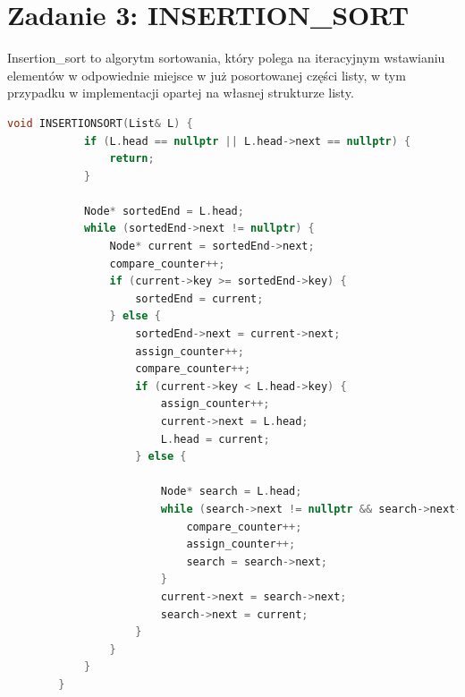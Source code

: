 \documentclass{article}
\theoremstyle{definition}
\begin{document}
	\section{Zadanie 3: INSERTION\_SORT}
	Insertion\_sort to algorytm sortowania, który polega na iteracyjnym wstawianiu elementów w odpowiednie miejsce w już posortowanej części listy, w tym przypadku w implementacji opartej na własnej strukturze listy.
	\begin{lstlisting}[language=C++, tabsize=3, caption={Implementacja INSERTION\_SORT}]
		void INSERTIONSORT(List& L) {
			if (L.head == nullptr || L.head->next == nullptr) {
				return;
			}
			
			Node* sortedEnd = L.head;
			while (sortedEnd->next != nullptr) {
				Node* current = sortedEnd->next;
				compare_counter++;
				if (current->key >= sortedEnd->key) {
					sortedEnd = current;
				} else {
					sortedEnd->next = current->next;
					assign_counter++;
					compare_counter++;
					if (current->key < L.head->key) {
						assign_counter++;
						current->next = L.head;
						L.head = current;
					} else {
						
						Node* search = L.head;
						while (search->next != nullptr && search->next->key < current->key) {
							compare_counter++;
							assign_counter++;
							search = search->next;
						}
						current->next = search->next;
						search->next = current;
					}
				}
			}
		}
	\end{lstlisting}
\end{document}
